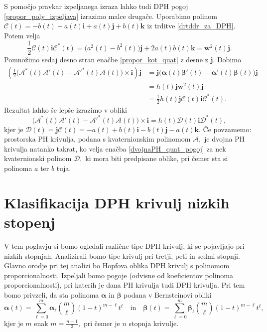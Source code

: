 \documentclass[12pt,a4paper,twoside]{article}
\theoremstyle{definition} %
\theoremstyle{plain} %
\theoremstyle{primerstyle}
\numberwithin{equation}{section}  %
\newcommand{\iV}{\mathbf{i}}
\newcommand{\jV}{\mathbf{j}}
\newcommand{\kV}{\mathbf{k}}
\newcommand{\wV}{\mathbf{w}}
\newcommand{\AQ}{\mathcal{A}}
\newcommand{\CQ}{\mathcal{C}}
\newcommand{\DQ}{\mathcal{D}}
\newcommand{\balpha}{\boldsymbol \alpha}
\newcommand{\bbeta}{\boldsymbol \beta}
\begin{document}
S pomočjo pravkar izpeljanega izraza lahko tudi DPH pogoj \eqref{propor_poly_izpeljava} izrazimo malce drugače. Uporabimo polinom $\CQ(t)=-b(t)+a(t)\iV+a(t)\jV+b(t)\kV$ iz trditve \ref{drtddr_za_DPH}. Potem velja
\begin{equation*}
	\frac{1}{2}\CQ(t)\iV\CQ^*(t)=\big(a^2(t)-b^2(t)\big)\jV+2a(t)b(t)\kV=\wV^2(t)\jV.
\end{equation*}
Pomnožimo sedaj desno stran enačbe \eqref{propor_kot_quat} z desne z $\jV.$ Dobimo
\begin{align*}
	\left(\frac{1}{2}\big(\AQ^*(t)\AQ'(t)-\AQ'^*(t)\AQ(t)\big)\times\iV\right)\jV&=\jV\big(\balpha(t)\bbeta'(t)-\balpha'(t)\bbeta(t)\big)\jV\\
	&=h(t)\jV\wV^2(t)\jV\\
	&=\frac{1}{2}h(t)\jV\CQ(t)\iV\CQ^*(t).
\end{align*}
Rezultat lahko še lepše izrazimo v obliki
\begin{equation}
	\label{dvojnaPH_quat_pogoj}
	\big(\AQ^*(t)\AQ'(t)-\AQ'^*(t)\AQ(t)\big)\times\iV=h(t)\DQ(t)\iV\DQ^*(t),
\end{equation}
kjer je $\DQ(t)=\jV\CQ(t)=-a(t)+b(t)\iV-b(t)\jV-a(t)\kV.$ Če povzamemo: prostorska PH krivulja, podana s kvaternionskim polinomom $\AQ,$ je dvojna PH krivulja natanko takrat, ko velja enačba \eqref{dvojnaPH_quat_pogoj} za nek kvaternionski polinom $\DQ,$ ki mora biti predpisane oblike, pri čemer sta si polinoma $a$ ter $b$ tuja.
\clearpage

\section{Klasifikacija DPH krivulj nizkih stopenj}

V tem poglavju si bomo ogledali različne tipe DPH krivulj, ki se pojavljajo pri nizkih stopnjah. Analizirali bomo tipe krivulj pri tretji, peti in sedmi stopnji. Glavno orodje pri tej analizi bo Hopfova oblika DPH krivulj s polinomom proporcionalnosti. Izpeljali bomo pogoje (odvisne od koeficientov polinoma proporcionalnosti), pri katerih je dana PH krivulja tudi DPH krivulja. Pri tem bomo privzeli, da sta polinoma $\balpha$ in $\bbeta$ podana v Bernsteinovi obliki
\begin{equation*}
	\balpha(t)=\sum_{\ell=0}^m\balpha_\ell\binom{m}{\ell}(1-t)^{m-\ell}t^\ell\quad\text{in}\quad\bbeta(t)=\sum_{\ell=0}^m\bbeta_\ell\binom{m}{\ell}(1-t)^{m-\ell}t^\ell,
\end{equation*}
kjer je $m$ enak $m=\frac{n-1}{2},$ pri čemer je $n$ stopnja krivulje.
\end{document}
